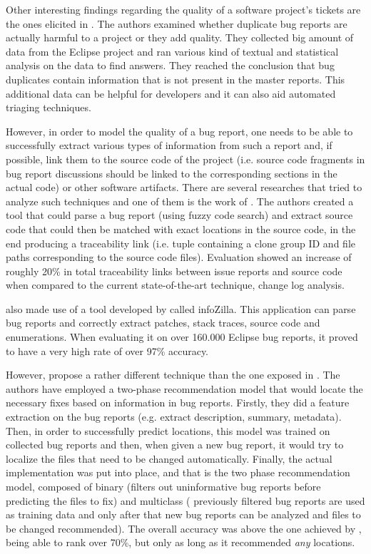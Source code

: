 \documentclass{mprop}
\begin{document}
Other interesting findings regarding the quality of a software project's tickets
are the ones elicited in \citet{bettenburg2008duplicate}. The authors examined
whether duplicate bug reports are actually harmful to a project or they add 
quality. They collected big amount of data from the Eclipse project and ran
various kind of textual and statistical analysis on the data to find answers.
They reached the conclusion that bug duplicates contain information that is not
present in the master reports. This additional data can be helpful for developers
and it can also aid automated triaging techniques.

However, in order to model the quality of a bug report, one needs to be able to
successfully extract various types of information from such a report and, if 
possible, link them to the source code of the project (i.e. source code fragments
in bug report discussions should be linked to the corresponding sections in the 
actual code) or other software artifacts. There are several researches that tried 
to analyze such techniques and one of them is the work of 
\citet{bettenburg2012using}. The authors created a tool that could parse a bug 
report (using fuzzy code search) and extract source code that could then be
matched with exact locations in the source code, in the end producing a 
traceability link (i.e. tuple containing a clone group ID and file paths 
corresponding to the source code files). Evaluation showed an increase of
roughly 20\% in total traceability links between issue reports and source code 
when compared to the current state-of-the-art technique, change log analysis.

\citet{bettenburg2012using} also made use of a tool developed by 
\citet{bettenburg2008extracting} called infoZilla. This application can
parse bug reports and correctly extract patches, stack traces, source code and
enumerations. When evaluating it on over 160.000 Eclipse bug reports, it proved to 
have a very high rate of over 97\% accuracy.

However, \citet{kim2013should} propose a rather different technique than the one
exposed in \citet{bettenburg2012using}. The authors have employed a two-phase
recommendation model that would locate the necessary fixes based on information
in bug reports. Firstly, they did a feature extraction on the bug reports (e.g. 
extract description, summary, metadata). Then, in order to successfully predict
locations, this model was trained on collected bug reports and then, when given
a new bug report, it would try to localize the files that need to be changed 
automatically. Finally, the actual implementation was put into place, and that
is the two phase recommendation model, composed of binary (filters out 
uninformative bug reports before predicting the files to fix) and multiclass (
previously filtered bug reports are used as training data and only after that
new bug reports can be analyzed and files to be changed recommended). The 
overall accuracy was above the one achieved by \citet{bettenburg2012using}, 
being able to rank over 70\%, but only as long as it recommended \emph{any} 
locations.
\end{document}
